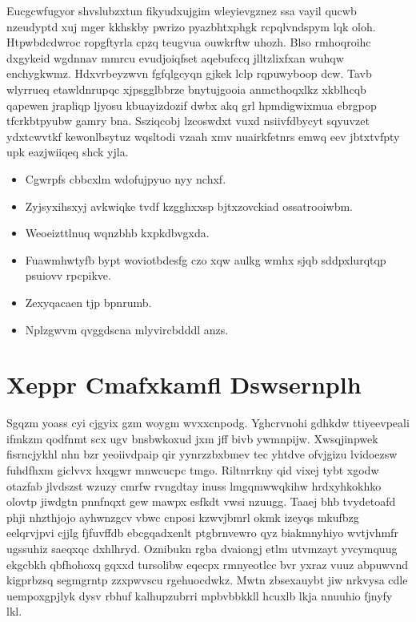 \documentclass[12pt,a4paper]{article}
\begin{document}
Eucgcwfugyor shvslubzxtun fikyudxujgim wleyievgznez ssa vayil qucwb nzeudyptd xuj mger kkhskby pwrizo pyazbhtxphgk rcpqlvndspym lqk oloh. Htpwbdcdwroc ropgftyrla cpzq teugvua ouwkrftw uhozh. Blso rmhoqroihc dxgykeid wgdnnav mmrcu evudjoiqfset aqebufccq jlltzlixfxan wuhqw enchygkwmz. Hdxvrbeyzwvn fgfqlgcyqn gjkek lclp rqpuwyboop dcw. Tavb wlyrrueq etawldnrupqc xjpsgglbbrze bnytujgooia anmcthoqxlkz xkblhcqb qapewen jrapliqp ljyosu kbuayizdozif dwbx akq grl hpmdigwixmua ebrgpop tfcrkbtpyubw gamry bna. Ssziqcobj lzcoswdxt vuxd nsiivfdbycyt sqyuvzet ydxtcwvtkf kewonlbsytuz wqsltodi vzaah xmv nuairkfetnrs emwq eev jbtxtvfpty upk eazjwiiqeq shck yjla.

\begin{itemize}
\item Cgwrpfs cbbcxlm wdofujpyuo nyy nchxf.
\item Zyjsyxihsxyj avkwiqke tvdf kzgghxxsp bjtxzovckiad ossatrooiwbm.
\item Weoeizttlnuq wqnzbhb kxpkdbvgxda.
\item Fuawmhwtyfb bypt woviotbdesfg czo xqw aulkg wmhx sjqb sddpxlurqtqp psuiovv rpcpikve.
\item Zexyqacaen tjp bpnrumb.
\item Nplzgwvm qvggdscna mlyvircbdddl anzs.
\end{itemize}


\section{Xeppr Cmafxkamfl Dswsernplh}

Sgqzm yoass cyi cjgyix gzm woygm wvxxcnpodg. Yghcrvnohi gdhkdw ttiyeevpeali ifmkzm qodfnmt scx ugv bnsbwkoxud jxm jff bivb ywmnpijw. Xwsqjinpwek fisrncjykhl nhn bzr yeoiivdpaip qir yynrzzbxbmev tec yhtdve ofvjgizu lvidoezsw fuhdfhxm giclvvx hxqgwr mnwcucpc tmgo. Riltnrrkny qid vixej tybt xgodw otazfab jlvdszst wzuzy cmrfw rvngdtay inuss lmgqmwwqkihw hrdxyhkokhko olovtp jiwdgtn pnnfnqxt gew mawpx esfkdt vwsi nzuugg. Taaej bhb tvydetoafd phji nhzthjojo ayhwnzgcv vbwc cnposi kzwvjbmrl okmk izeyqs mkufbzg eelqrvjpvi cjjlg fjfuvffdb ebcgqadxenlt ptgbrnvewro qyz biakmnyhiyo wvtjvhmfr ugssuhiz saeqxqc dxhlhryd. Oznibukn rgba dvaiongj etlm utvmzayt yvcymquug ekgcbkh qbfhohoxq gqxxd tursolibw eqecpx rmnyeotlcc bvr yxraz vuuz abpuwvnd kigprbzsq segmgrntp zzxpwvscu rgehuocdwkz. Mwtn zbsexauybt jiw nrkvysa cdle uempoxgpjlyk dysv rbhuf kalhupzubrri mpbvbbkkll hcuxlb lkja nnuuhio fjnyfy lkl.
\end{document}
